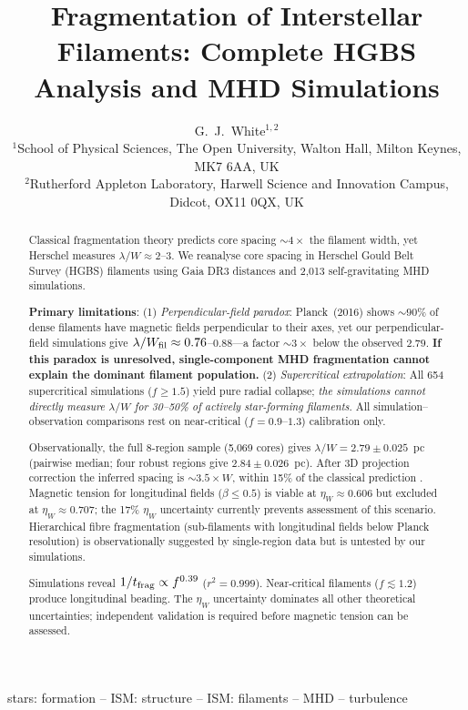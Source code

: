\documentclass[twoside,twocolumn]{mnras}
\title{Fragmentation of Interstellar Filaments: Complete HGBS Analysis and MHD Simulations}
\author[G.~J.~White]{G.~J.~White$^{1,2}$\\
$^{1}$School of Physical Sciences, The Open University, Walton Hall, Milton Keynes, MK7 6AA, UK\\
$^{2}$Rutherford Appleton Laboratory, Harwell Science and Innovation Campus, Didcot, OX11 0QX, UK}
\begin{document}
\maketitle

\begin{abstract}
Classical fragmentation theory predicts core spacing ${\sim}4\times$ the filament
width, yet Herschel measures $\lambda/W \approx 2$--$3$. We reanalyse core spacing
in Herschel Gould Belt Survey (HGBS) filaments using Gaia DR3 distances and 2,013
self-gravitating MHD simulations.

\textbf{Primary limitations}: (1) \textit{Perpendicular-field paradox}: Planck~(2016) shows ${\sim}90\%$ of dense filaments have magnetic fields perpendicular to their axes, yet our perpendicular-field simulations give $\lambda/W_{\rm fil} \approx 0.76$--$0.88$---a factor ${\sim}3\times$ below the observed $2.79$. \textbf{If this paradox is unresolved, single-component MHD fragmentation cannot explain the dominant filament population.} (2) \textit{Supercritical extrapolation}: All 654 supercritical simulations ($f \geq 1.5$) yield pure radial collapse; \textit{the simulations cannot directly measure $\lambda/W$ for 30--50\% of actively star-forming filaments}. All simulation--observation comparisons rest on near-critical ($f = 0.9$--$1.3$) calibration only.

Observationally, the full 8-region sample (5,069 cores) gives $\lambda/W = 2.79 \pm 0.025$~pc (pairwise median; four robust regions give $2.84 \pm 0.026$~pc). After 3D projection correction the inferred spacing is ${\sim}3.5\times W$, within 15\% of the classical prediction \citep{Inutsuka1992}. Magnetic tension for longitudinal fields ($\beta \leq 0.5$) is viable at $\eta_W \approx 0.606$ but excluded at $\eta_W \approx 0.707$; the 17\% $\eta_W$ uncertainty currently prevents assessment of this scenario. Hierarchical fibre fragmentation (sub-filaments with longitudinal fields below Planck resolution) is observationally suggested by single-region data \citep{Yang2024} but is untested by our simulations.

Simulations reveal $1/t_{\rm frag} \propto f^{0.39}$ ($r^2 = 0.999$). Near-critical filaments ($f \lesssim 1.2$) produce longitudinal beading. The $\eta_W$ uncertainty dominates all other theoretical uncertainties; independent validation is required before magnetic tension can be assessed.
\end{abstract}

\begin{keywords}
stars: formation -- ISM: structure -- ISM: filaments -- MHD -- turbulence
\end{keywords}
\end{document}
